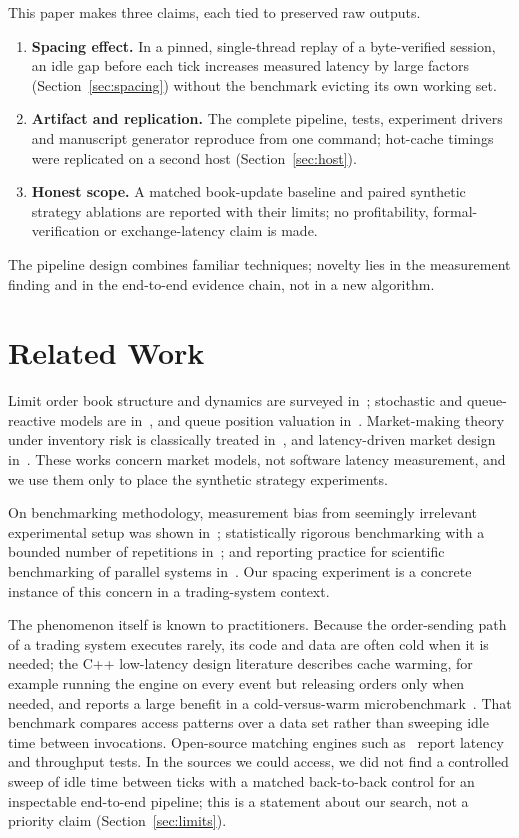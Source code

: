 \documentclass[conference]{IEEEtran}
\begin{document}
This paper makes three claims, each tied to preserved raw outputs.
\begin{enumerate}
\item \textbf{Spacing effect.} In a pinned, single-thread replay of a byte-verified session, an idle gap before each tick increases measured latency by large factors (Section~\ref{sec:spacing}) without the benchmark evicting its own working set.
\item \textbf{Artifact and replication.} The complete pipeline, tests, experiment drivers and manuscript generator reproduce from one command; hot-cache timings were replicated on a second host (Section~\ref{sec:host}).
\item \textbf{Honest scope.} A matched book-update baseline and paired synthetic strategy ablations are reported with their limits; no profitability, formal-verification or exchange-latency claim is made.
\end{enumerate}
The pipeline design combines familiar techniques; novelty lies in the measurement finding and in the end-to-end evidence chain, not in a new algorithm.

\section{Related Work}
Limit order book structure and dynamics are surveyed in~\cite{gould2013}; stochastic and queue-reactive models are in~\cite{cont2010,huang2015}, and queue position valuation in~\cite{moallemi2017}. Market-making theory under inventory risk is classically treated in~\cite{avellaneda2008}, and latency-driven market design in~\cite{budish2015}. These works concern market models, not software latency measurement, and we use them only to place the synthetic strategy experiments.

On benchmarking methodology, measurement bias from seemingly irrelevant experimental setup was shown in~\cite{mytkowicz2009}; statistically rigorous benchmarking with a bounded number of repetitions in~\cite{kalibera2013}; and reporting practice for scientific benchmarking of parallel systems in~\cite{hoefler2015}. Our spacing experiment is a concrete instance of this concern in a trading-system context.

The phenomenon itself is known to practitioners. Because the order-sending path of a trading system executes rarely, its code and data are often cold when it is needed; the C++ low-latency design literature describes cache warming, for example running the engine on every event but releasing orders only when needed, and reports a large benefit in a cold-versus-warm microbenchmark~\cite{bilokon2023}. That benchmark compares access patterns over a data set rather than sweeping idle time between invocations. Open-source matching engines such as~\cite{jericevich2021} report latency and throughput tests. In the sources we could access, we did not find a controlled sweep of idle time between ticks with a matched back-to-back control for an inspectable end-to-end pipeline; this is a statement about our search, not a priority claim (Section~\ref{sec:limits}).
\end{document}

